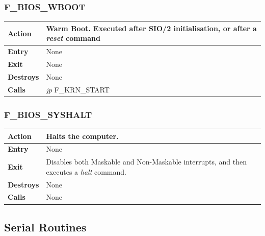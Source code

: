 \documentclass[a4paper,11pt]{article}
\begin{document}
        \subsubsection{F\_BIOS\_WBOOT}
        \label{func:fbioswboot}
        \begin{tabular}{l p{9cm}}
            \hline\textbf{Action}
            & Warm Boot. Executed after \textbf{SIO/2} initialisation, or after a
            \textit{reset} command \\
            \hline\textbf{Entry} & None \\
            \hline\textbf{Exit} & None \\
            \hline\textbf{Destroys} & None \\
            \hline\textbf{Calls} & \textit{jp} F\_KRN\_START \\
            \hline
        \end{tabular}

        \subsubsection{F\_BIOS\_SYSHALT}
        \label{func:fbiossyshalt}
        \begin{tabular}{l p{9cm}}
            \hline\textbf{Action}
            & Halts the computer.\\
            \hline\textbf{Entry} & None \\
            \hline\textbf{Exit} & Disables both Maskable and Non-Maskable
            interrupts, and then executes a \textit{halt} command.\\
            \hline\textbf{Destroys} & None \\
            \hline\textbf{Calls} & None \\
            \hline
        \end{tabular}

    \subsection{Serial Routines}
\end{document}
